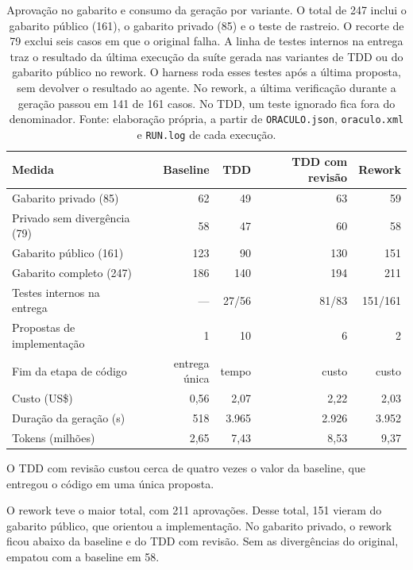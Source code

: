 \documentclass[a4paper,12pt,twoside,english,brazilian]{book}
\begin{document}
\begin{table}[htp]
  \centering
  \caption{Aprovação no gabarito e consumo da geração por variante. O total
    de 247 inclui o gabarito público (161), o gabarito privado (85) e o teste
    de rastreio. O recorte de 79 exclui seis casos em que o original falha.
    A linha de testes internos na entrega traz o resultado da última
    execução da suíte gerada nas variantes de TDD ou do gabarito público
    no rework. O harness roda esses testes após a última proposta, sem
    devolver o resultado ao agente. No rework, a última verificação
    durante a geração passou em 141 de 161 casos. No TDD, um teste ignorado
    fica fora do denominador.
    Fonte: elaboração própria, a partir de \texttt{ORACULO.json},
    \texttt{oraculo.xml} e \texttt{RUN.log} de cada execução.}
  \label{tab:prejanus-resultados}
  \small
  \begin{tabular}{lrrrr}
    \hline
    Medida & Baseline & TDD & TDD com revisão & Rework \\
    \hline
    Gabarito privado (85) & 62 & 49 & 63 & 59 \\
    Privado sem divergência (79) & 58 & 47 & 60 & 58 \\
    Gabarito público (161) & 123 & 90 & 130 & 151 \\
    Gabarito completo (247) & 186 & 140 & 194 & 211 \\
    \hline
    Testes internos na entrega & --- & 27/56 & 81/83 & 151/161 \\
    Propostas de implementação & 1 & 10 & 6 & 2 \\
    Fim da etapa de código & entrega única & tempo & custo & custo \\
    Custo (US\$) & 0,56 & 2,07 & 2,22 & 2,03 \\
    Duração da geração (s) & 518 & 3.965 & 2.926 & 3.952 \\
    Tokens (milhões) & 2,65 & 7,43 & 8,53 & 9,37 \\
    \hline
  \end{tabular}
\end{table}

O TDD com revisão custou cerca de quatro vezes o valor da baseline, que
entregou o código em uma única proposta.

O rework teve o maior total, com 211 aprovações. Desse total, 151 vieram do
gabarito público, que orientou a implementação. No gabarito privado, o rework
ficou abaixo da baseline e do TDD com revisão. Sem as divergências do original,
empatou com a baseline em 58.
\end{document}
